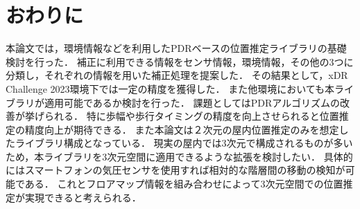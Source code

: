 

\section{おわりに}
本論文では，環境情報などを利用したPDRベースの位置推定ライブラリの基礎検討を行った．
補正に利用できる情報をセンサ情報，環境情報，その他の3つに分類し，それぞれの情報を用いた補正処理を提案した．
その結果として，xDR Challenge 2023環境下では一定の精度を獲得した．
また他環境においても本ライブラリが適用可能であるか検討を行った．
課題としてはPDRアルゴリズムの改善が挙げられる．
特に歩幅や歩行タイミングの精度を向上させられると位置推定の精度向上が期待できる．
また本論文は２次元の屋内位置推定のみを想定したライブラリ構成となっている．
現実の屋内では3次元で構成されるものが多いため，本ライブラリを3次元空間に適用できるような拡張を検討したい．
具体的にはスマートフォンの気圧センサを使用すれば相対的な階層間の移動の検知が可能である．
これとフロアマップ情報を組み合わせによって3次元空間での位置推定が実現できると考えられる．

